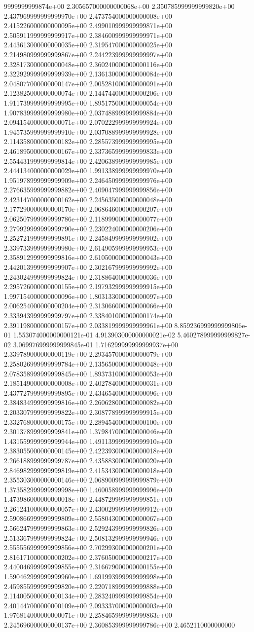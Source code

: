 9999999999874e+00	2.305657000000000068e+00	2.350785999999999820e+00	2.437969999999999970e+00	2.473754000000000008e+00	2.415226000000000095e+00	2.499010999999999871e+00	2.505911999999999917e+00	2.384600999999999971e+00	2.443613000000000035e+00	2.319547000000000025e+00	2.214980999999999867e+00	2.244223999999999997e+00	2.328173000000000048e+00	2.360240000000000116e+00	2.322929999999999939e+00	2.136130000000000084e+00	2.048077000000000147e+00	2.005281000000000091e+00	2.123825000000000074e+00	2.144744000000000206e+00	1.911739999999999995e+00	1.895175000000000054e+00	1.907839999999999980e+00	2.037488999999999884e+00	2.094154000000000071e+00	2.070222999999999924e+00	1.945735999999999910e+00	2.037088999999999928e+00	2.114358000000000182e+00	2.285573999999999995e+00	2.461895000000000167e+00	2.337365999999999833e+00	2.554431999999999814e+00	2.420638999999999985e+00	2.444134000000000029e+00	1.991338999999999970e+00	1.951978999999999909e+00	2.246450999999999976e+00	2.276635999999999882e+00	2.409047999999999856e+00	2.423147000000000162e+00	2.245635000000000048e+00	2.177290000000000170e+00	2.068646000000000207e+00	2.062507999999999786e+00	2.118999000000000077e+00	2.279929999999999790e+00	2.230224000000000206e+00	2.252721999999999891e+00	2.245849999999999902e+00	2.339733999999999980e+00	2.614905999999999953e+00	2.358912999999999816e+00	2.610500000000000043e+00	2.442013999999999907e+00	2.302167999999999992e+00	2.243024999999999824e+00	2.318864000000000036e+00	2.295726000000000155e+00	2.197932999999999915e+00	1.997154000000000096e+00	1.803133000000000097e+00	2.006254000000000204e+00	2.313066000000000066e+00	2.333943999999999797e+00	2.338401000000000174e+00	2.391198000000000157e+00	2.033819999999999961e+00	8.859236999999999806e-01	1.553074000000000121e-01	4.913903000000000021e-02	5.460278999999999827e-02	3.069976999999999845e-01	1.716299999999999937e+00	2.339789000000000119e+00	2.293457000000000079e+00	2.258026999999999784e+00	2.135650000000000048e+00	2.078358999999999845e+00	1.893731000000000053e+00	2.185149000000000008e+00	2.402784000000000031e+00	2.437727999999999895e+00	2.434654000000000096e+00	2.384834999999999816e+00	2.260628000000000082e+00	2.203307999999999822e+00	2.308778999999999915e+00	2.332768000000000175e+00	2.289454000000000100e+00	2.301378999999999841e+00	1.379847000000000046e+00	1.431559999999999944e+00	1.491139999999999910e+00	2.383055000000000145e+00	2.422393000000000018e+00	2.266188999999999787e+00	2.435883000000000020e+00	2.846982999999999819e+00	2.415343000000000018e+00	2.355303000000000146e+00	2.068900999999999879e+00	1.373582999999999998e+00	1.460058999999999996e+00	1.473986000000000018e+00	2.448729999999999851e+00	2.261241000000000057e+00	2.430029999999999912e+00	2.590866999999999809e+00	2.558043000000000067e+00	2.566247999999999863e+00	2.529243999999999826e+00	2.513367999999999824e+00	2.508132999999999946e+00	2.555556999999999856e+00	2.702993000000000201e+00	2.816171000000000202e+00	2.376050000000000217e+00	2.440046999999999855e+00	2.316679000000000155e+00	1.590462999999999960e+00	1.691993999999999998e+00	2.459855999999999820e+00	2.220718999999999888e+00	2.114005000000000134e+00	2.283240999999999854e+00	2.401447000000000109e+00	2.093337000000000003e+00	1.976814000000000071e+00	2.258465999999999863e+00	2.245696000000000137e+00	2.360853999999999786e+00	2.4652110000000000